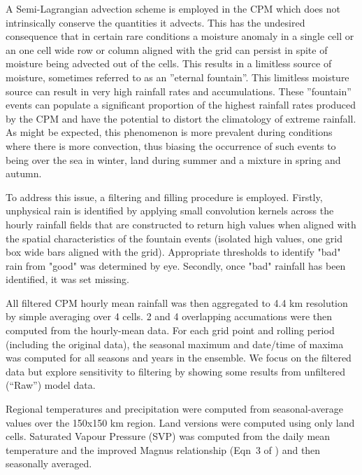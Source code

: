 \documentclass[11pt,a4paper]{article}
\begin{document}
A Semi-Lagrangian advection scheme is employed in the CPM which does not intrinsically conserve the quantities it advects. This has the undesired consequence that in certain rare conditions a moisture anomaly in a single cell or  an one cell wide row or column aligned with the grid can persist in spite of moisture being advected out of the cells. This results in a limitless source of moisture, sometimes referred to as an ''eternal fountain''.  This limitless moisture source can result in very high rainfall rates and accumulations.  These ''fountain'' events can populate a significant proportion of the highest rainfall rates produced by the CPM and have the potential to distort the climatology of extreme rainfall.  As might be expected, this phenomenon is more prevalent during conditions where there is more convection, thus biasing the occurrence of such events to being over the sea in winter, land during summer and a mixture in spring and autumn.

To address this issue, a filtering and filling procedure is employed.  Firstly, unphysical rain is identified by applying small convolution kernels across the hourly rainfall fields that are constructed to return high values when aligned with the spatial characteristics of the fountain events (isolated high values, one grid box wide bars aligned with the grid).  Appropriate thresholds to identify "bad" rain from "good" was determined by eye.  Secondly, once "bad" rainfall has been identified, it was set missing. 

All filtered CPM hourly mean rainfall was then aggregated to 4.4 km resolution by simple averaging over 4 cells.  2 and 4  overlapping accumations were then computed from the hourly-mean data. For each grid point and rolling period (including the original data),  the seasonal  maximum and date/time of maxima was computed for all seasons and years in the ensemble. We focus on the filtered data but  explore sensitivity to filtering by showing some results from unfiltered (``Raw'') model data.

Regional temperatures and precipitation were computed from seasonal-average values over the 150x150 km region. Land versions were computed using only land cells. Saturated Vapour Pressure (SVP) was computed from the daily mean temperature and the improved Magnus relationship (Eqn~3 of \cite{Huang2018SVP}) and then seasonally averaged.
\end{document}
